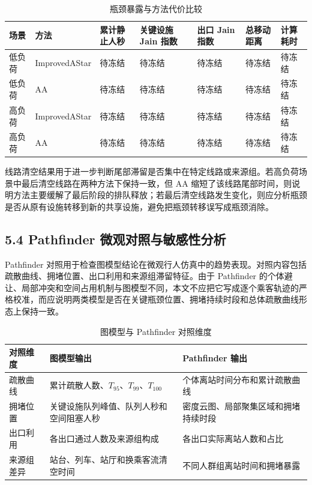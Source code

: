 \documentclass[UTF8,a4paper,12pt]{ctexart}
\begin{document}
\begin{table}[htbp]
\centering
\caption{瓶颈暴露与方法代价比较}
\small
\begin{tabular}{p{}p{}p{}p{}p{}p{}p{}}
\toprule
场景 & 方法 & 累计静止人秒 & 关键设施 Jain 指数 & 出口 Jain 指数 & 总移动距离 & 计算耗时 \\
\midrule
低负荷 & ImprovedAStar & 待冻结 & 待冻结 & 待冻结 & 待冻结 & 待冻结 \\
低负荷 & AA & 待冻结 & 待冻结 & 待冻结 & 待冻结 & 待冻结 \\
高负荷 & ImprovedAStar & 待冻结 & 待冻结 & 待冻结 & 待冻结 & 待冻结 \\
高负荷 & AA & 待冻结 & 待冻结 & 待冻结 & 待冻结 & 待冻结 \\
\bottomrule
\end{tabular}
\end{table}

线路清空结果用于进一步判断尾部滞留是否集中在特定线路或来源组。若高负荷场景中最后清空线路在两种方法下保持一致，但 AA 缩短了该线路尾部时间，则说明方法主要缓解了最后阶段的排队释放；若最后清空线路发生变化，则应分析瓶颈是否从原有设施转移到新的共享设施，避免把瓶颈转移误写成瓶颈消除。

\subsection{5.4 Pathfinder 微观对照与敏感性分析}

Pathfinder 对照用于检查图模型结论在微观行人仿真中的趋势表现。对照内容包括疏散曲线、拥堵位置、出口利用和来源组滞留特征。由于 Pathfinder 的个体避让、局部冲突和空间占用机制与图模型不同，本文不应把它写成逐个乘客轨迹的严格校准，而应说明两类模型是否在关键瓶颈位置、拥堵持续时段和总体疏散曲线形态上保持一致。

\begin{table}[htbp]
\centering
\caption{图模型与 Pathfinder 对照维度}
\small
\begin{tabular}{p{}p{}p{}}
\toprule
对照维度 & 图模型输出 & Pathfinder 输出 \\
\midrule
疏散曲线 & 累计疏散人数、\(T_{95}\)、\(T_{99}\)、\(T_{100}\) & 个体离站时间分布和累计疏散曲线 \\
拥堵位置 & 关键设施队列峰值、队列人秒和空间阻塞人秒 & 密度云图、局部聚集区域和拥堵持续时段 \\
出口利用 & 各出口通过人数及来源组构成 & 各出口实际离站人数和占比 \\
来源组差异 & 站台、列车、站厅和换乘客流清空时间 & 不同人群组离站时间和拥堵暴露 \\
\bottomrule
\end{tabular}
\end{table}
\end{document}

